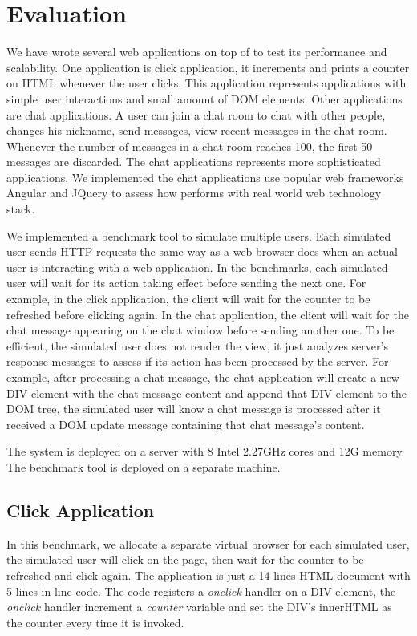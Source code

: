 \section{Evaluation}
\label{sec:eval}
We have wrote several web applications on top of \cb{} to test its
performance and scalability.
One application is click application,
it increments and prints a counter on HTML whenever the user clicks.
This application represents applications with simple user interactions and small amount of DOM elements.
Other applications are chat applications.
A user can join a chat room to chat with other people,
changes his nickname, send messages, view recent messages in the chat room.
Whenever the number of messages in a chat room reaches 100, the first 50 messages
are discarded.
The chat applications represents more sophisticated applications.
We implemented the chat applications use popular web frameworks Angular and JQuery
to assess how \cb{} performs with real world web technology stack.

\chatroomfig{}

We implemented a benchmark tool to simulate multiple users.
Each simulated user sends HTTP requests the same way as
a web browser does when an actual user is interacting with a web application.
In the benchmarks, each simulated user will wait for its action taking effect before 
sending the next one.
For example, in the click application, the client will wait for the counter
to be refreshed before clicking again.
In the chat application, the client will wait for
the chat message appearing on the chat window before sending another one.
To be efficient, the simulated user does not render the view, 
it just analyzes server's response messages to assess 
if its action has been processed by the server.
For example, after processing a chat message, 
the chat application will create a new DIV element with the chat message content
and append that DIV element to the DOM tree, 
the simulated user will know a chat message is processed after it received
a DOM update message containing that chat message's content.

The \cb{} system is deployed on a server with 8 Intel 2.27GHz cores and 12G memory.
The benchmark tool is deployed on a separate machine.

\subsection{Click Application}
In this benchmark,
we allocate a separate virtual browser for each simulated user,
the simulated user will click on the page, 
then wait for the counter to be refreshed and click again.
The application is just a 14 lines HTML document with 5 lines in-line \js{} code.
The \js{} code registers a \emph{onclick} handler on a DIV element,
the \emph{onclick} handler increment a \emph{counter} variable and set the DIV's innerHTML as
the counter every time it is invoked.
\clickthroughput{}

